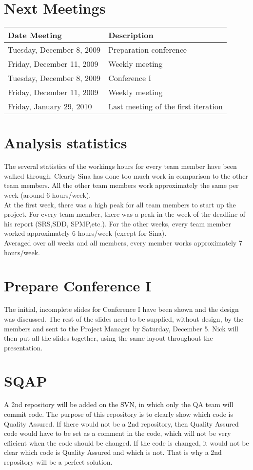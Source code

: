 \documentclass[a4paper, 12pt]{article}
\begin{document}
	\section{Next Meetings}
			\begin{tabular}{l | l }
				\textbf{Date Meeting} & \textbf{Description} \\
				\hline
				Tuesday, December 8, 2009 & Preparation conference \\
				Friday, December 11, 2009 & Weekly meeting \\
				Tuesday, December 8, 2009 & Conference I \\
				Friday, December 11, 2009 & Weekly meeting \\
				Friday, January 29, 2010 & Last meeting of the first iteration \\
			\end{tabular}	
	\section{Analysis statistics}
		The several statistics of the workings hours for every team member have been walked through. Clearly Sina has done too much work in comparison to the other team members. All the other team members work approximately the same per week (around 6 hours/week). \\
		At the first week, there was a high peak for all team members to start up the project. For every team member, there was a peak in the week of the deadline of his report (SRS,SDD, SPMP,etc.). For the other weeks, every team member worked approximately 6 hours/week (except for Sina). \\ Averaged over all weeks and all members, every member works approximately 7 hours/week. 
		
	\section{Prepare Conference I}
The initial, incomplete slides for Conference I have been shown and the design was discussed. The rest of the slides need to be supplied, without design, by the members and sent to the Project Manager by Saturday, December 5. Nick will then put all the slides together, using the same layout throughout the presentation.
	\section{SQAP}
A 2nd repository will be added on the SVN, in which only the QA team will commit code. The purpose of this repository is to clearly show which code is Quality Assured. If there would not be a 2nd repository, then Quality Assured code would have to be set as a comment in the code, which will not be very efficient when the code should be changed. If the code is changed, it would not be clear which code is Quality Assured and which is not. That is why a 2nd repository will be a perfect solution.
 
\end{document}
